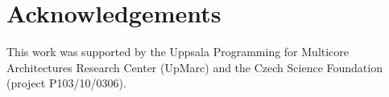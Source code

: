 \section{Acknowledgements}
\label{section:acknowledgements}
This work was supported by the Uppsala Programming for Multicore
Architectures Research Center
(UpMarc) %
and the Czech Science Foundation (project P103/10/0306).
